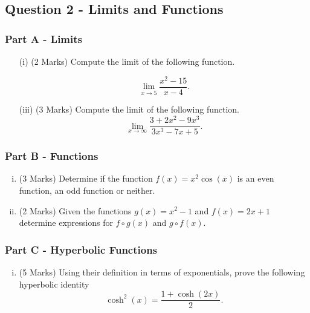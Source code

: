 \documentclass[a4paper,12pt]{article}
\begin{document}
\newpage
\subsection*{Question 2 - Limits and Functions}
\subsubsection*{Part A - Limits}
\begin{enumerate}
	\item[(i)] (2 Marks)  Compute the limit of the following function.
	
	\[\lim_{x \to 5 } \frac{x^2-15}{x-4}.\]
		
		\bigskip
	
	\item[(iii)] (3 Marks) Compute the limit of the following function.
	\[ \lim_{x \to \infty } \frac{3 + 2x^2 - 9x^3 }{3x^3 - 7x + 5}. \]	
	
\end{enumerate}

\subsubsection*{Part B - Functions}
\begin{enumerate}[(i)]
	\item (3 Marks) Determine if the function $f(x) = x^2\cos(x)$ is an even function, an odd function or neither.
	\bigskip
	\item (2 Marks) Given the functions $g(x) = x^2-1$ and $f(x) = 2x+1$ determine expressions for $f \circ g(x)$ and $g \circ f(x)$.
\end{enumerate}
	\bigskip
\subsubsection*{Part C - Hyperbolic Functions}


\begin{enumerate}[(i)]
	\item (5 Marks) Using their definition in terms of exponentials, prove the following hyperbolic identity  \[	\cosh^2(x) =  \frac{1 + \cosh(2x)}{2}.\]
	
\end{enumerate}
\newpage
\end{document}
